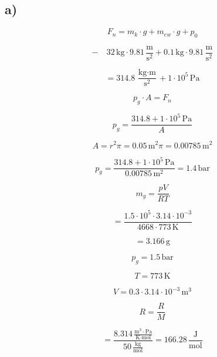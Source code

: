 

\subsection*{a)}

\[
F_n = m_k \cdot g + m_{ew} \cdot g + p_0
\]

\[
- \quad 32 \, \text{kg} \cdot 9.81 \, \frac{\text{m}}{\text{s}^2} + 0.1 \, \text{kg} \cdot 9.81 \, \frac{\text{m}}{\text{s}^2}
\]

\[
= 314.8 \, \frac{\text{kg} \cdot \text{m}}{\text{s}^2} + 1 \cdot 10^5 \, \text{Pa}
\]

\[
p_g \cdot A = F_n
\]

\[
p_g = \frac{314.8 + 1 \cdot 10^5 \, \text{Pa}}{A}
\]

\[
A = r^2 \pi = 0.05 \, \text{m}^2 \pi = 0.00785 \, \text{m}^2
\]

\[
p_g = \frac{314.8 + 1 \cdot 10^5 \, \text{Pa}}{0.00785 \, \text{m}^2} = 1.4 \, \text{bar}
\]

\[
m_g = \frac{pV}{RT}
\]

\[
= \frac{1.5 \cdot 10^5 \cdot 3.14 \cdot 10^{-3}}{4668 \cdot 773 \, \text{K}}
\]

\[
= 3.166 \, \text{g}
\]

\[
p_g = 1.5 \, \text{bar}
\]

\[
T = 773 \, \text{K}
\]

\[
V = 0.3 \cdot 3.14 \cdot 10^{-3} \, \text{m}^3
\]

\[
R = \frac{R}{M}
\]

\[
= \frac{8.314 \, \frac{\text{m}^3 \cdot \text{Pa}}{\text{K} \cdot \text{mol}}}{50 \, \frac{\text{kg}}{\text{mol}}} = 166.28 \, \frac{\text{J}}{\text{mol}}
\]